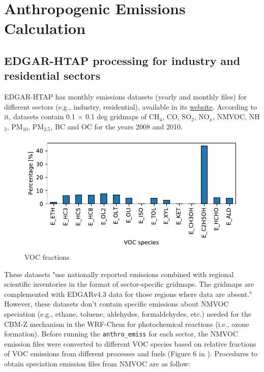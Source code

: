 	\begin{singlespace*}
		{\scriptsize }
	\end{singlespace*}

\section {Anthropogenic Emissions Calculation}\label{ap02}

\subsection{EDGAR-HTAP processing for industry and residential sectors}
EDGAR-HTAP has monthly emissions datasets (yearly and monthly files) for different sectors (e.g., industry, residential), available in its \href{https://edgar.jrc.ec.europa.eu/htap_v2/}{website}.
According to it, datasets contain 0.1 $\times$ 0.1 deg gridmaps of CH$_4$, CO, SO$_2$, NO$_x$, NMVOC, NH$_3$, PM$_{10}$, PM$_{2.5}$, BC and OC for the years 2008 and 2010.
\begin{figure}[!htb]
	\centering
  \includegraphics[width=.7\textwidth]{fig/voc_frac.pdf}
  \caption{VOC fractions}
  \label{fig: voc_frac}
\end{figure}
These datasets "use nationally reported emissions combined with regional scientific inventories in the format of sector-specific gridmaps. The gridmaps are complemented with EDGARv4.3 data for those regions where data are absent."
However, these datasets don't contain specific emissions about NMVOC speciation (e.g., ethane, toluene, aldehydes, formaldehydes, etc.) needed for the CBM-Z mechanism in the WRF-Chem for photochemical reactions (i.e., ozone formation).
 Before running the \verb|anthro_emiss| for each sector, the NMVOC emission files were converted to different VOC species based on relative fractions of VOC emissions from different processes and fuels (Figure 6 in \citealt{Andrade2015}). 
Procedures to obtain speciation emission files from NMVOC are as follow:

